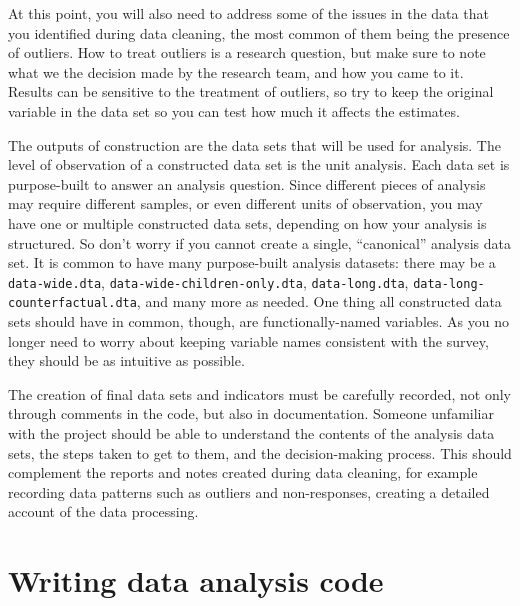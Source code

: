 At this point, you will also need to address some of the issues in the data
that you identified during data cleaning,
the most common of them being the presence of outliers.
How to treat outliers is a research question, 
but make sure to note what we the decision made by the research team,
and how you came to it. 
Results can be sensitive to the treatment of outliers,
so try to keep the original variable in the data set 
so you can test how much it affects the estimates.


The outputs of construction are the data sets that will be used for analysis.
The level of observation of a constructed data set is the unit analysis. 
Each data set is purpose-built to answer an analysis question.
Since different pieces of analysis may require different samples,
or even different units of observation,
you may have one or multiple constructed data sets, 
depending on how your analysis is structured.
So don't worry if you cannot create a single, ``canonical'' analysis data set.
It is common to have many purpose-built analysis datasets:
there may be a \texttt{data-wide.dta},
\texttt{data-wide-children-only.dta}, \texttt{data-long.dta},
\texttt{data-long-counterfactual.dta}, and many more as needed.
One thing all constructed data sets should have in common, though,
are functionally-named variables.
As you no longer need to worry about keeping variable names
consistent with the survey, they should be as intuitive as possible.

The creation of final data sets and indicators must be carefully recorded,
not only through comments in the code, but also in documentation.
Someone unfamiliar with the project should be able to understand
the contents of the analysis data sets,
the steps taken to get to them,
and the decision-making process.
This should complement the reports and notes 
created during data cleaning, 
for example recording data patterns such as
outliers and non-responses, 
creating a detailed account of the data processing.




\section{Writing data analysis code}

